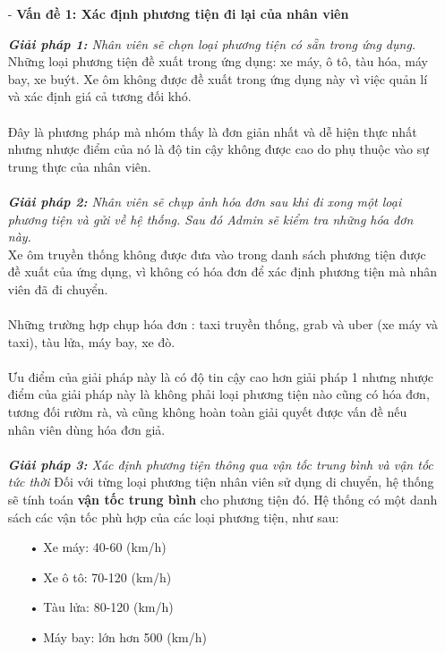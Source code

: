 \documentclass[a4paper]{article}
\begin{document}
\begin{itemize}    
    \item[-] \textbf{Vấn đề 1: Xác định phương tiện đi lại của nhân viên}\par
    \textit{\textbf{Giải pháp 1:} Nhân viên sẽ chọn loại phương tiện có sẵn trong ứng dụng.}\\
    Những loại phương tiện đề xuất trong ứng dụng: xe máy, ô tô, tàu hóa, máy bay, xe buýt. Xe ôm không được đề xuất trong ứng dụng  này vì việc quản lí và xác định giá cả tương đối khó.\\
    \\ 
    Đây là phương pháp mà nhóm thấy là đơn giản nhất và dễ hiện thực nhất nhưng nhược điểm của nó là độ tin cậy không được cao do phụ thuộc vào sự trung thực của nhân viên.\\
    \\
    \textit{\textbf{Giải pháp 2:} Nhân viên sẽ chụp ảnh hóa đơn sau khi đi xong một loại phương tiện và gửi về hệ thống. Sau đó Admin sẽ kiểm tra những hóa đơn này.}\\
    Xe ôm truyền thống không được đưa vào trong danh sách phương tiện được đề xuất của ứng dụng, vì không có hóa đơn để xác định phương tiện mà nhân viên đã đi chuyển.\\
    \\	
    Những trường hợp chụp hóa đơn : taxi truyền thống, grab và uber (xe máy và taxi), tàu lửa, máy bay, xe đò.\\
    \\
    Ưu điểm của giải pháp này là có độ tin cậy cao hơn giải pháp 1 nhưng nhược điểm của giải pháp này là không phải loại phương tiện nào cũng có hóa đơn, tương đối rườm rà, và cũng không hoàn toàn giải quyết được vấn đề nếu nhân viên dùng hóa đơn giả.\\
    \\
    \textit{\textbf{Giải pháp 3:} Xác định phương tiện thông qua vận tốc trung bình và vận tốc tức thời}
    Đối với từng loại phương tiện nhân viên sử dụng di chuyển, hệ thống sẽ tính toán \textbf{vận tốc trung bình} cho phương tiện đó. Hệ thống có một danh sách các vận tốc phù hợp của các loại phương tiện, như sau: 
    \begin{itemize}  
        \item[•] Xe máy: 40-60 (km/h)
        \item[•] Xe ô tô: 70-120 (km/h)
        \item[•] Tàu lửa: 80-120 (km/h)
        \item[•] Máy bay: lớn hơn 500 (km/h)

\end{itemize}
\end{itemize}
\end{document}
